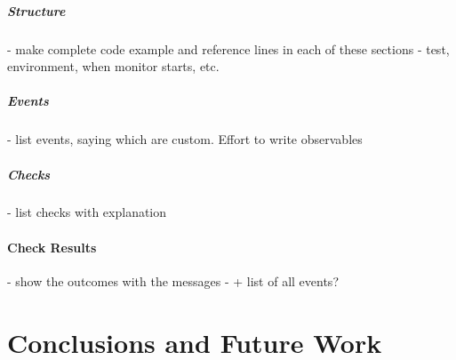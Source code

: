 \documentclass[11pt,a4paper,notitlepage]{article}
\begin{document}
{\subsubsection{Structure}
- make complete code example and reference lines in each of these sections
- test, environment, when monitor starts, etc.

\subsubsection{Events}
- list events, saying which are custom. Effort to write observables

\subsubsection{Checks}
- list checks with explanation

\subsection{Check Results}
- show the outcomes with the messages
- + list of all events?

}




\newpage
\part{Conclusions and Future Work}\label{part_conclusion}
\end{document}
